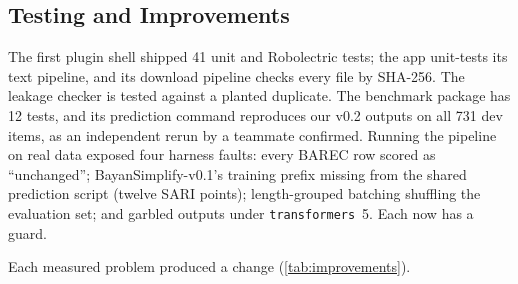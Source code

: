 \documentclass[10pt,a4paper]{article}
\newcommand{\vOne}{BayanSimplify-v0.1}
\begin{document}
\FloatBarrier
\subsection{Testing and Improvements}

 The first plugin shell shipped 41 unit and Robolectric tests; the
app unit-tests its text pipeline, and its download pipeline checks every file by
SHA-256. The leakage checker is tested against a planted duplicate. The benchmark
package has 12 tests, and its prediction command reproduces our v0.2 outputs on
all 731 dev items, as an independent rerun by a teammate confirmed. Running the
pipeline on real data exposed four harness faults: every BAREC row scored as
``unchanged''; \vOne{}'s training prefix missing from the shared prediction script
(twelve SARI points); length-grouped batching shuffling the evaluation set; and
garbled outputs under \texttt{transformers}~5. Each now has a guard.

 Each measured problem produced a change
(\autoref{tab:improvements}).
\end{document}
